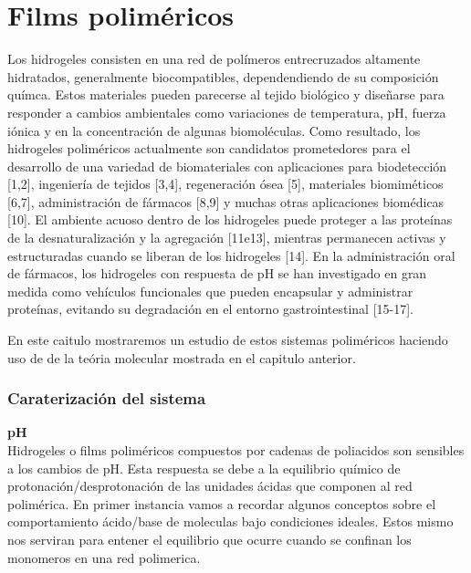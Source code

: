 
\chapter{Films polim\'ericos} %

\label{Chapter2} %



Los hidrogeles consisten en una red de pol\'imeros entrecruzados altamente hidratados, generalmente biocompatibles, dependendiendo de su composici\'on qu\'imca. Estos materiales pueden parecerse al tejido biol\'ogico y dise\~narse para responder a cambios ambientales como variaciones de temperatura, pH, fuerza i\'onica y en la concentraci\'on de algunas biomol\'eculas. Como resultado, los hidrogeles polim\'ericos actualmente son candidatos prometedores para el desarrollo de una variedad de biomateriales con aplicaciones para biodetección [1,2], ingenier\'ia de tejidos [3,4], regeneraci\'on \'osea [5], materiales biomim\'eticos [6,7], administraci\'on de f\'armacos [8,9] y muchas otras aplicaciones biom\'edicas [10]. El ambiente acuoso dentro de los hidrogeles puede proteger a las prote\'inas de la desnaturalización y la agregaci\'on [11e13], mientras permanecen activas y estructuradas cuando se liberan de los hidrogeles [14]. En la administraci\'on oral de f\'armacos, los hidrogeles con respuesta de pH se han investigado en gran medida como veh\'iculos funcionales que pueden encapsular y administrar prote\'inas, evitando su degradaci\'on en el entorno gastrointestinal [15-17].


En este caitulo mostraremos un estudio  de estos sistemas polim\'ericos haciendo uso de de la te\'oria molecular mostrada en el capitulo anterior. 



\subsection{Caraterizaci\'on del sistema}
\textbf{pH} \\
Hidrogeles o films poliméricos compuestos por cadenas de poliacidos son sensibles a los cambios de pH. Esta respuesta se debe a la equilibrio químico de protonación/desprotonación de las unidades ácidas que componen al red polimérica. 
En primer instancia vamos a recordar algunos conceptos sobre el comportamiento ácido/base de moleculas bajo condiciones ideales. 
Estos mismo nos serviran para entener el equilibrio que ocurre cuando se confinan los monomeros en una red polimerica.

